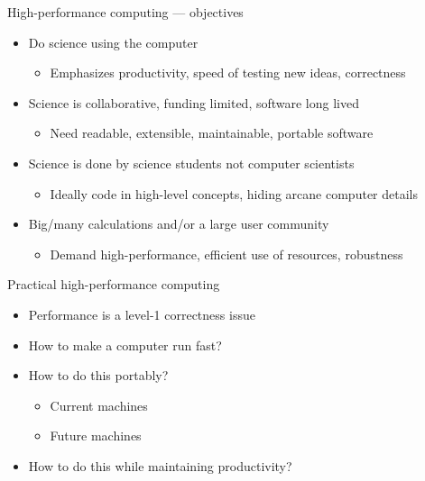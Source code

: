 \begin{frame}{High-performance computing --- objectives}

  \begin{itemize}
  \item Do science using the computer
    \begin{itemize}
    \item Emphasizes productivity, speed of testing new ideas, correctness
    \end{itemize}
    
  \item Science is collaborative, funding limited, software long lived
      \begin{itemize}
      \item Need readable, extensible, maintainable, portable software
      \end{itemize}
      
  \item Science is done by science students not computer scientists
      \begin{itemize}
      \item Ideally code in high-level concepts, hiding arcane computer details
      \end{itemize}

  \item Big/many calculations and/or a large user community
      \begin{itemize}
      \item Demand high-performance, efficient use of resources, robustness
      \end{itemize}
  \end{itemize}
\end{frame}

\begin{frame}{Practical high-performance computing}
  \begin{itemize}
  \item Performance is a level-1 correctness issue
  \item How to make a computer run fast?
  \item How to do this portably?
    \begin{itemize}
    \item Current machines
    \item Future machines
    \end{itemize}
  \item How to do this while maintaining productivity?
  \end{itemize}
\end{frame}
